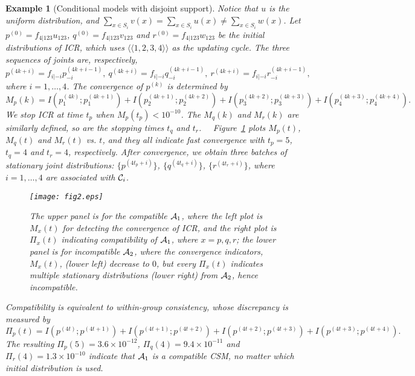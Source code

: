 \documentclass[12pt,a4paper]{article}
\newtheorem{example}{Example}
\begin{document}
\begin{example} [Conditional models with disjoint support]
Notice that $u$ is  the uniform distribution, and
$\sum_{x\in S_i}v(x)=\sum_{x\in S_i}u(x)\neq \sum_{x\in S_i}w(x)$.
Let  $p^{(0)}=f_{4|123}u_{123}$, $q^{(0)}=f_{4|123}v_{123}$ and $r^{(0)}=f_{4|123}w_{123}$ be the
initial distributions of  ICR, which uses $\langle \langle 1,2,3,4\rangle \rangle$ as the updating cycle. %
The three sequences of joints are, respectively,
\[p^{(4k+i)}=f_{i|-i}p_{-i}^{(4k+i-1)},\ q^{(4k+i)}=f_{i|-i}q_{-i}^{(4k+i-1)},\
r^{(4k+i)}=f_{i|-i}r_{-i}^{(4k+i-1)},\]
where $i=1,\ldots,4$.
The convergence of $p^{(k)}$ is determined by
\[M_p(k)=I(p_1^{(4k)};p_1^{(4k+1)})+I(p_2^{(4k+1)};p_2^{(4k+2)})+I(p_3^{(4k+2)};p_3^{(4k+3)})+
I(p_4^{(4k+3)};p_4^{(4k+4)}).\]
We stop  ICR at time $t_p$ when $M_p(t_p)<10^{-10}$.
The $M_q(k)$ and $M_r(k)$ are similarly defined,
so are the stopping times $t_q$ and $t_r$.%
~~Figure~\ref{fig:2} plots $M_p(t)$, $M_q(t)$ and $M_r(t)$ vs. $t$, and they all indicate
fast convergence with $t_p=5$, $t_q=4$ and $t_r=4$, respectively.
After convergence, we obtain three batches of stationary joint distributions:
$\{p^{(4t_p+i)}\}$, $\{q^{(4t_q+i)}\}$, $\{r^{(4t_r+i)}\}$, where $i=1,\ldots,4$ are associated with ${\cal C}_i$.

\begin{figure}
\begin{center}
\texttt{[image: fig2.eps]}
\end{center}
\vspace{-0.8cm}
\caption{\small The upper panel is for the compatible ${\cal A}_1$, where the left plot is
$M_x(t)$ for detecting the convergence of ICR, and the right plot is $\Pi_x(t)$ indicating compatibility of ${\cal A}_1$,  where $x=p,q,r$;
the lower panel is for incompatible ${\cal A}_2$,  where the convergence indicators, $M_x(t)$, (lower left)  decrease  to $0$, but every $\Pi_x(t)$  indicates multiple stationary distributions (lower right) from ${\cal A}_2$, hence incompatible. \label{fig:2}}
\end{figure}

Compatibility is equivalent to within-group consistency, whose discrepancy is measured by
\[\Pi_p(t)=I(p^{(4t)};p^{(4t+1)})+I(p^{(4t+1)};p^{(4t+2)})+I(p^{(4t+2)};p^{(4t+3)})+I(p^{(4t+3)};p^{(4t+4)}).\]
The resulting $\Pi_p(5)=3.6\times 10^{-12}$, $\Pi_q(4)=9.4\times 10^{-11}$ and $\Pi_r(4)=1.3\times 10^{-10}$
indicate that  ${\cal A}_1$ is a compatible CSM, no matter which initial distribution is used.


\end{example}
\end{document}
